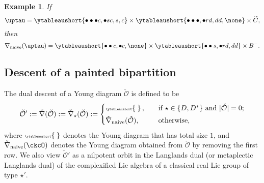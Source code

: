 \documentclass[12pt]{amsart}
\let\ytb=\ytableaushort
\newcommand{\tytb}[1]{{\tiny\ytb{#1}}}
\newcommand{\CO}{{\mathcal {O}}}
\def\DD{\nabla}
\numberwithin{equation}{section}
\newtheorem{eg}[thm]{Example}
\theoremstyle{remark}
\def\DD{\nabla}
\def\tnaive{\mathrm{naive}}
\def\ckDD{{\check\DD}}
\def\DD{\nabla}
\def\ckDDn{{\ckDD}_{\tnaive}}
\begin{document}
 \begin{eg} If
    \[
     \uptau = \ytb{\bullet\bullet\bullet {c},\bullet {s} {c},{s},{c}}
    \times \ytb{\bullet\bullet\bullet ,\bullet {r} {d},{d}{d}, \none}
    \times \widetilde C, \]
   then
   \[
    \nabla_{\mathrm{naive}}(\uptau) =\ytb{\bullet\bullet{c} ,\bullet{c},\none }
    \times  \ytb{\bullet\bullet {s} ,\bullet {r} {d},{d}{d}}\times B^-.
    \]

\end{eg}


\subsection{Descent of a painted bipartition}
   The dual descent of a Young diagram $\check \CO$ is defined to be
  \[
   \check \CO':=\check \nabla(\check \CO):=\check \nabla_\star( \check \CO):=\begin{cases}
   \tytb{\   }\, , \quad& \textrm{if $\star\in \{D, D^*\}$ and $|\check \CO|=0$};\smallskip\\
   \check \nabla_{\mathrm{naive}}(\check \CO), \quad & \textrm{otherwise},
    \end{cases}
  \]
  where $\tytb{\   }$ denotes the Young diagram that has total size $1$,
  and $\ckDDn(\ckcO)$ denotes the Young diagram obtained from $\check \CO$ by removing the first row. We also view $\check \CO'$ as a nilpotent orbit in the Langlands dual (or metaplectic Langlands dual) of the complexified Lie algebra of a classical real Lie group of type $\star'$.
\end{document}
